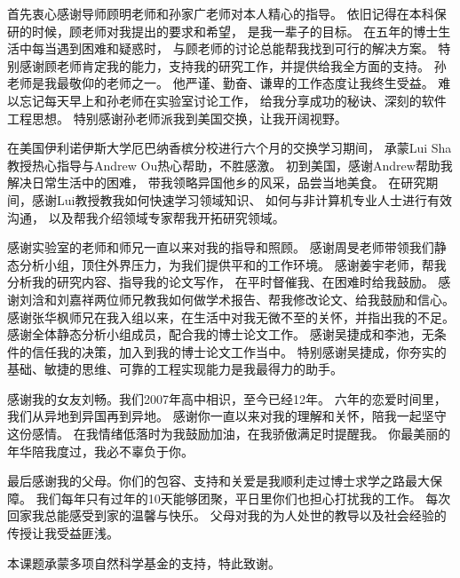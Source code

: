 \begin{acknowledgement}
  首先衷心感谢导师顾明老师和孙家广老师对本人精心的指导。
  依旧记得在本科保研的时候，顾老师对我提出的要求和希望，
  是我一辈子的目标。
  在五年的博士生活中每当遇到困难和疑惑时，
  与顾老师的讨论总能帮我找到可行的解决方案。
  特别感谢顾老师肯定我的能力，支持我的研究工作，并提供给我全方面的支持。
  孙老师是我最敬仰的老师之一。
  他严谨、勤奋、谦卑的工作态度让我终生受益。
  难以忘记每天早上和孙老师在实验室讨论工作，
  给我分享成功的秘诀、深刻的软件工程思想。
  特别感谢孙老师派我到美国交换，让我开阔视野。

  
  在美国伊利诺伊斯大学厄巴纳香槟分校进行六个月的交换学习期间，
  承蒙Lui Sha教授热心指导与Andrew Ou热心帮助，不胜感激。
  初到美国，感谢Andrew帮助我解决日常生活中的困难，
  带我领略异国他乡的风采，品尝当地美食。
  在研究期间，感谢Lui教授教我如何快速学习领域知识、
  如何与非计算机专业人士进行有效沟通，
  以及帮我介绍领域专家帮我开拓研究领域。
  

  感谢实验室的老师和师兄一直以来对我的指导和照顾。
  感谢周旻老师带领我们静态分析小组，顶住外界压力，为我们提供平和的工作环境。
  感谢姜宇老师，帮我分析我的研究内容、指导我的论文写作，
  在平时督催我、在困难时给我鼓励。
  感谢刘浛和刘嘉祥两位师兄教我如何做学术报告、帮我修改论文、给我鼓励和信心。
  感谢张华枫师兄在我入组以来，在生活中对我无微不至的关怀，并指出我的不足。  
  感谢全体静态分析小组成员，配合我的博士论文工作。
  感谢吴捷成和李池，无条件的信任我的决策，加入到我的博士论文工作当中。
  特别感谢吴捷成，你夯实的基础、敏捷的思维、可靠的工程实现能力是我最得力的助手。
  
  感谢我的女友刘畅。我们2007年高中相识，至今已经12年。
  六年的恋爱时间里，我们从异地到异国再到异地。
  感谢你一直以来对我的理解和关怀，陪我一起坚守这份感情。
  在我情绪低落时为我鼓励加油，在我骄傲满足时提醒我。
  你最美丽的年华陪我度过，我必不辜负于你。
  
  最后感谢我的父母。你们的包容、支持和关爱是我顺利走过博士求学之路最大保障。
  我们每年只有过年的10天能够团聚，平日里你们也担心打扰我的工作。
  每次回家我总能感受到家的温馨与快乐。
  父母对我的为人处世的教导以及社会经验的传授让我受益匪浅。
  
  本课题承蒙多项自然科学基金的支持，特此致谢。
\end{acknowledgement}
